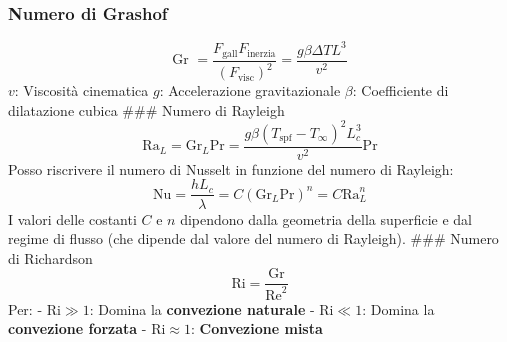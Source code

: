\hypertarget{numero-di-grashof}{%
\subsubsection{Numero di Grashof}\label{numero-di-grashof}}

\[\text{Gr }=\frac{F_\text{gall}F_\text{inerzia}}{(F_\text{visc})^2}=\frac{g\beta \Delta TL^3}{v^2}\]
\(v\): Viscosità cinematica \(g\): Accelerazione gravitazionale
\(\beta\): Coefficiente di dilatazione cubica \#\#\# Numero di Rayleigh
\[\text{Ra}_L=\text{Gr}_L\text{Pr}=\frac{g\beta(T_\text{spf}-T_\infty)^2L_c^3}{v^2}\text{Pr}\]
Posso riscrivere il numero di Nusselt in funzione del numero di
Rayleigh:
\[\text{Nu}=\frac{hL_c}{\lambda}=C(\text{Gr}_L\text{Pr})^n=C\text{Ra}_L^n\]
I valori delle costanti \(C\) e \(n\) dipendono dalla geometria della
superficie e dal regime di flusso (che dipende dal valore del numero di
Rayleigh). \#\#\# Numero di Richardson
\[\text{Ri}=\frac{\text{Gr}}{\text{Re}^2}\] Per: - \(\text{Ri} \gg 1\):
Domina la \textbf{convezione naturale} - \(\text{Ri} \ll 1\): Domina la
\textbf{convezione forzata} - \(\text{Ri} \approx 1\):
\textbf{Convezione mista}
